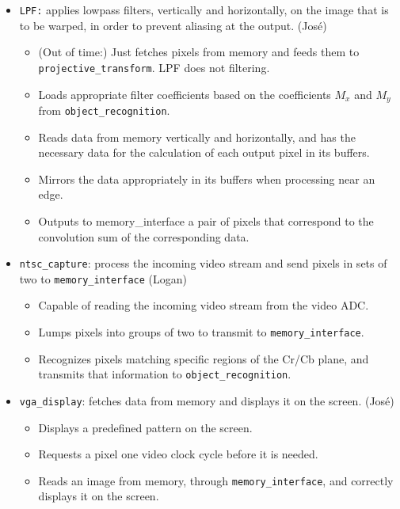 \documentclass{article}
\begin{document}
\begin{itemize}
\item[] {\tt LPF:} applies lowpass filters, vertically and horizontally, on the image that is to be warped, in order to prevent aliasing at the output. (Jos\'{e})
	\begin{itemize}
	\item (Out of time:) Just fetches pixels from memory and feeds them to {\tt projective\_transform}. LPF does not filtering.
	\item Loads appropriate filter coefficients based on the coefficients $M_x$ and $M_y$ from {\tt object\_recognition}.
	\item Reads data from memory vertically and horizontally, and has the necessary data for the calculation of each output pixel in its buffers.
	\item Mirrors the data appropriately in its buffers when processing near an edge.
	\item Outputs to memory\_interface a pair of pixels that correspond to the convolution sum of the corresponding data.
	\end{itemize}

\item[] {\tt ntsc\_capture}: process the incoming video stream and send pixels in sets of two to {\tt memory\_interface} (Logan)
	\begin{itemize}
	\item Capable of reading the incoming video stream from the video ADC.
	\item Lumps pixels into groups of two to transmit to {\tt memory\_interface}.
	\item Recognizes pixels matching specific regions of the Cr/Cb plane, and transmits that information to {\tt object\_recognition}.
	\end{itemize}

\item[] {\tt vga\_display}: fetches data from memory and displays it on the screen. (Jos\'{e})
	\begin{itemize}
	\item Displays a predefined pattern on the screen.
	\item Requests a pixel one video clock cycle before it is needed.
	\item Reads an image from memory, through {\tt memory\_interface}, and correctly displays it on the screen.
	\end{itemize}

\end{itemize}
\end{document}
